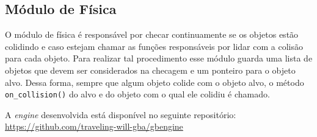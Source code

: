 \subsection{Módulo de Física}

O módulo de física é responsável por checar continuamente se os objetos estão colidindo e caso estejam chamar as funções responsáveis por lidar com a colisão para cada objeto. Para realizar tal procedimento esse módulo guarda uma lista de objetos que devem ser considerados na checagem e um ponteiro para o objeto alvo. Dessa forma, sempre que algum objeto colide com o objeto alvo, o método \texttt{on\_collision()} do alvo e do objeto com o qual ele colidiu é chamado.


A \textit{engine} desenvolvida está disponível no seguinte repositório: \url{https://github.com/traveling-will-gba/gbengine}